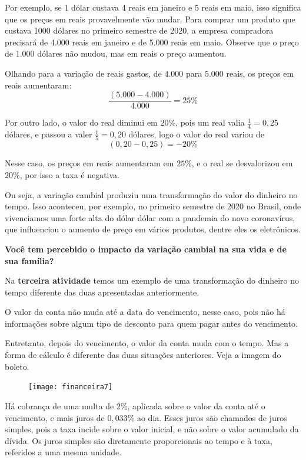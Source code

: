 Por exemplo, se 1 dólar custava 4 reais em janeiro e 5 reais em maio, isso significa que os preços em reais provavelmente vão mudar. Para comprar um produto que custava 1000 dólares no primeiro semestre de 2020, a empresa compradora precisará de 4.000 reais em janeiro e de 5.000 reais em maio. Observe que o preço de 1.000 dólares não mudou, mas em reais o preço aumentou.

Olhando para a variação de reais gastos, de $4.000$ para $5.000$ reais, os preços em reais aumentaram:
\begin{equation*}
\frac{(5.000-4.000)}{4.000}=25\%
\end{equation*}

Por outro lado, o valor do real diminui em $20$\%, pois um real valia $\frac{1}{4}=0{,}25$ dólares, e passou a valer $\frac{1}{5}=0{,}20$ dólares, logo o valor do real variou de 
\begin{equation*}
(0{,}20-0{,}25)=-20\%
\end{equation*}

Nesse caso, os preços em reais aumentaram em $25$\%, e o real se desvalorizou em $20$\%, por isso a taxa é negativa.

Ou seja, a variação cambial produziu uma transformação do valor do dinheiro no tempo. Isso aconteceu, por exemplo, no primeiro semestre de 2020 no Brasil, onde vivenciamos uma forte alta do dólar dólar com a pandemia do novo coronavírus, que influenciou o aumento de preço em vários produtos, dentre eles os eletrônicos.

\textbf{Você tem percebido o impacto da variação cambial na sua vida e de sua família?}

Na \textbf{terceira atividade} temos um exemplo de uma transformação do dinheiro no tempo diferente das duas apresentadas anteriormente.

O valor da conta não muda até a data do vencimento, nesse caso, pois não há informações sobre algum tipo de desconto para quem pagar antes do vencimento.

Entretanto, depois do vencimento, o valor da conta muda com o tempo. Mas a forma de cálculo é diferente das duas situações anteriores. Veja a imagem do boleto.

\begin{figure}[H]
\centering

\texttt{[image: financeira7]}
\end{figure}

Há cobrança de uma multa de $2$\%, aplicada sobre o valor da conta até o vencimento, e mais juros de $0{,}033$\% ao dia. Esses juros são chamados de juros simples, pois a taxa incide sobre o valor inicial, e não sobre o valor acumulado da dívida. Os juros simples são diretamente proporcionais ao tempo e à taxa, referidos a uma mesma unidade.

